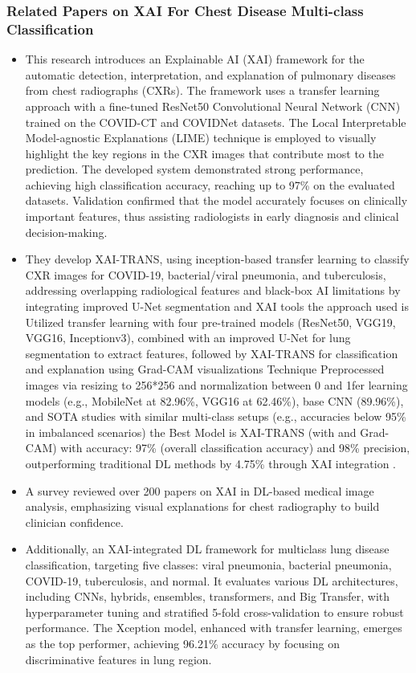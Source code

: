 \subsubsection{Related Papers on XAI For Chest Disease Multi-class Classification}
\begin{itemize} \itemsep 10pt
	\item This research introduces an Explainable AI (XAI) framework for the automatic detection, interpretation, and explanation of pulmonary diseases from chest radiographs (CXRs). The framework uses a transfer learning approach with a fine-tuned ResNet50 Convolutional Neural Network (CNN) trained on the COVID-CT and COVIDNet datasets. The Local Interpretable Model-agnostic Explanations (LIME) technique is employed to visually highlight the key regions in the CXR images that contribute most to the prediction. The developed system demonstrated strong performance, achieving high classification accuracy, reaching up to 97\% on the evaluated datasets. Validation confirmed that the model accurately focuses on clinically important features, thus assisting radiologists in early diagnosis and clinical decision-making\cite{ref24}.
	\item They develop XAI-TRANS, using inception-based transfer learning to classify CXR images for COVID-19, bacterial/viral pneumonia, and tuberculosis, addressing overlapping radiological features and black-box AI limitations by integrating improved U-Net segmentation and XAI tools the approach used is Utilized transfer learning with four pre-trained models (ResNet50, VGG19, VGG16, Inceptionv3), combined with an improved U-Net for lung segmentation to extract features, followed by XAI-TRANS for classification and explanation using Grad-CAM visualizations Technique Preprocessed images via resizing to 256*256 and normalization between 0 and 1fer learning models (e.g., MobileNet at 82.96\%, VGG16 at 62.46\%), base CNN (89.96\%), and SOTA studies with similar multi-class setups (e.g., accuracies below 95\% in imbalanced scenarios) the Best Model is XAI-TRANS (with and Grad-CAM) with accuracy: 97\% (overall classification accuracy) and 98\% precision, outperforming traditional DL methods by 4.75\% through XAI integration \cite{ref25}. 
	\item A survey reviewed over 200 papers on XAI in DL-based medical image analysis, emphasizing visual explanations for chest radiography to build clinician confidence\cite{ref26}.
	\item Additionally, an XAI-integrated DL framework for multiclass lung disease classification, targeting five classes: viral pneumonia, bacterial pneumonia, COVID-19, tuberculosis, and normal. It evaluates various DL architectures, including CNNs, hybrids, ensembles, transformers, and Big Transfer, with hyperparameter tuning and stratified 5-fold cross-validation to ensure robust performance. The Xception model, enhanced with transfer learning, emerges as the top performer, achieving 96.21\% accuracy by focusing on discriminative features in lung region\cite{ref27}.

\end{itemize}
